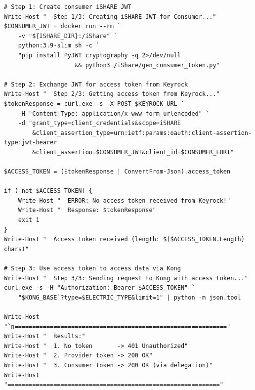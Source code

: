 \begin{lstlisting}[language={},]
# Step 1: Create consumer iSHARE JWT
Write-Host "  Step 1/3: Creating iSHARE JWT for Consumer..."
$CONSUMER_JWT = docker run --rm `
    -v "${ISHARE_DIR}:/iShare" `
    python:3.9-slim sh -c `
    "pip install PyJWT cryptography -q 2>/dev/null 
                    && python3 /iShare/gen_consumer_token.py"

# Step 2: Exchange JWT for access token from Keyrock
Write-Host "  Step 2/3: Getting access token from Keyrock..."
$tokenResponse = curl.exe -s -X POST $KEYROCK_URL `
    -H "Content-Type: application/x-www-form-urlencoded" `
    -d "grant_type=client_credentials&scope=iSHARE
        &client_assertion_type=urn:ietf:params:oauth:client-assertion-type:jwt-bearer
        &client_assertion=$CONSUMER_JWT&client_id=$CONSUMER_EORI"

$ACCESS_TOKEN = ($tokenResponse | ConvertFrom-Json).access_token

if (-not $ACCESS_TOKEN) {
    Write-Host "  ERROR: No access token received from Keyrock!"
    Write-Host "  Response: $tokenResponse"
    exit 1
}
Write-Host "  Access token received (length: $($ACCESS_TOKEN.Length) chars)"

# Step 3: Use access token to access data via Kong
Write-Host "  Step 3/3: Sending request to Kong with access token..."
curl.exe -s -H "Authorization: Bearer $ACCESS_TOKEN" `
    "$KONG_BASE`?type=$ELECTRIC_TYPE&limit=1" | python -m json.tool

Write-Host "`n============================================================"
Write-Host "  Results:"
Write-Host "  1. No token       -> 401 Unauthorized"
Write-Host "  2. Provider token -> 200 OK"
Write-Host "  3. Consumer token -> 200 OK (via delegation)"
Write-Host "============================================================"
\end{lstlisting}
